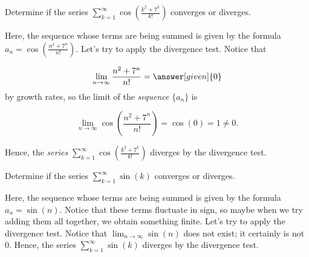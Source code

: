 \documentclass{ximera}
\begin{document}
%
%


\begin{example}
Determine if the series $\sum_{k=1}^{\infty} \cos\left(\frac{k^2+7^k}{k!} \right)$ converges or diverges.

\begin{explanation}
Here, the sequence whose terms are being summed is given by the formula $a_n =\cos\left(\frac{n^2+7^n}{n!} \right)$.  Let's try to apply the divergence test.  Notice that

\[
\lim_{n \to \infty} \frac{n^2+7^n}{n!} = \answer[given]{0}
\]
by growth rates, so the limit of the \emph{sequence} $\{a_n\}$ is

\[\lim_{n \to \infty} \cos\left(\frac{n^2+7^n}{n!} \right) = \cos(0) = 1 \neq 0.\]
  
Hence, the \emph{series} $\sum_{k=1}^{\infty} \cos\left(\frac{k^2+7^k}{k!} \right)$ diverges by the divergence test.
\end{explanation}
\end{example}

\begin{example}
Determine if the series $\sum_{k=1}^{\infty} \sin(k)$ converges or diverges.

\begin{explanation}
Here, the sequence whose terms are being summed is given by the formula $a_n =\sin(n)$.  Notice that these terms fluctuate in sign, so maybe when we try adding them all together, we obtain something finite.  Let's try to apply the divergence test.  Notice that $\lim_{n \to \infty} \sin(n)$ does not exist; it certainly is not 0. Hence, the series $\sum_{k=1}^{\infty} \sin(k)$ diverges by the divergence test.
\end{explanation}
\end{example}
\end{document}
